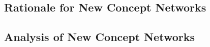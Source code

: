 \documentclass[graybox,envcountchap,sectrefs]{svmono}
\newcommand{\ncnf}{New Concept Network}
\begin{document}
\printbibliography

\begin{partbacktext}
\part{Rationale for \ncnf s}
\label{pt-2}
\end{partbacktext}

\begin{partbacktext}
\part{Analysis of \ncnf s}
\label{pt-3}
\end{partbacktext}



%

\backmatter

%

%

\printindex

\end{document}
